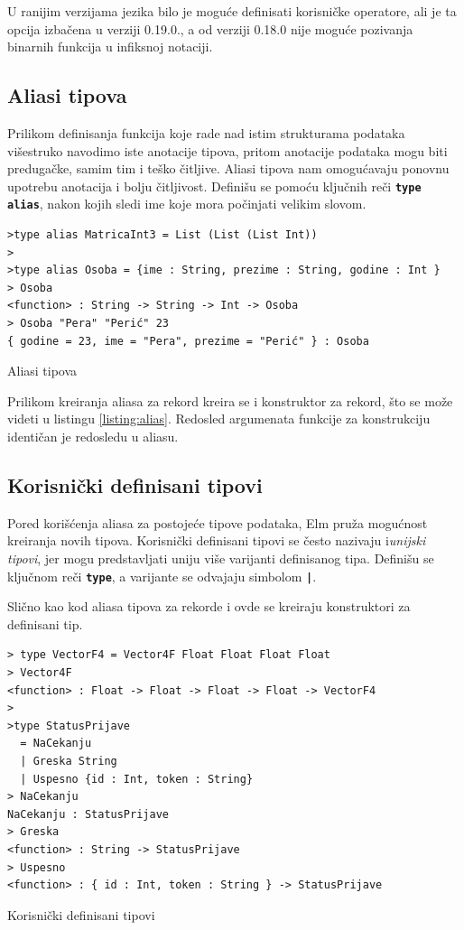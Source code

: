 \documentclass[12pt,oneside]{memoir}
\begin{document}
U ranijim verzijama jezika bilo je moguće definisati korisničke operatore, ali je ta
opcija izbačena u verziji 0.19.0., a od verziji 0.18.0 nije moguće pozivanja 
binarnih funkcija u infiksnoj notaciji.

\subsection{Aliasi tipova}
Prilikom definisanja funkcija koje rade nad istim strukturama podataka višestruko navodimo
iste anotacije tipova, pritom anotacije podataka mogu biti predugačke, samim tim i
teško čitljive. Aliasi tipova nam omogućavaju ponovnu upotrebu anotacija i bolju čitljivost.
Definišu se pomoću ključnih reči \texttt{\textbf{type alias}}, nakon kojih sledi ime koje
mora počinjati velikim slovom. 
\begin{listing}[h]
\begin{verbatim}
>type alias MatricaInt3 = List (List (List Int))
>
>type alias Osoba = {ime : String, prezime : String, godine : Int }
> Osoba
<function> : String -> String -> Int -> Osoba
> Osoba "Pera" "Perić" 23
{ godine = 23, ime = "Pera", prezime = "Perić" } : Osoba
\end{verbatim}
\caption{Aliasi tipova}
\label{listing:alias}
\end{listing}

Prilikom kreiranja aliasa za rekord kreira se i konstruktor za rekord, što se može videti
u listingu \ref{listing:alias}. Redosled argumenata funkcije za konstrukciju identičan je
redosledu u aliasu.
\subsection{Korisnički definisani tipovi}
Pored korišćenja aliasa za postojeće tipove podataka, Elm pruža mogućnost kreiranja novih 
tipova. Korisnički definisani tipovi se često nazivaju i\emph{unijski tipovi}, jer mogu  
predstavljati uniju više varijanti definisanog tipa. Definišu se ključnom reči 
\textbf{\texttt{type}}, a varijante se odvajaju simbolom \texttt{\textbf{|}}.

Slično kao kod aliasa tipova za rekorde i ovde se kreiraju konstruktori za definisani tip. 
\begin{listing}[h]
\begin{verbatim}
> type VectorF4 = Vector4F Float Float Float Float
> Vector4F
<function> : Float -> Float -> Float -> Float -> VectorF4
>
>type StatusPrijave 
  = NaCekanju 
  | Greska String 
  | Uspesno {id : Int, token : String}
> NaCekanju
NaCekanju : StatusPrijave
> Greska
<function> : String -> StatusPrijave
> Uspesno
<function> : { id : Int, token : String } -> StatusPrijave
\end{verbatim}
\caption{Korisnički definisani tipovi}
\end{listing}
\end{document}
